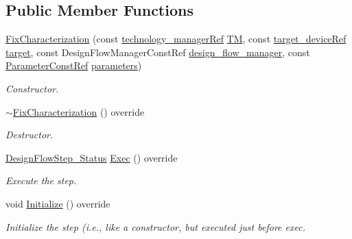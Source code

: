 \subsection*{Public Member Functions}
\begin{DoxyCompactItemize}
\item 
\hyperlink{classFixCharacterization_a4e029966461122b6b8d6d0cc25db66fc}{Fix\+Characterization} (const \hyperlink{technology__manager_8hpp_a4b9ecd440c804109c962654f9227244e}{technology\+\_\+manager\+Ref} \hyperlink{classTechnologyFlowStep_a4aeea30129ed65348c3bad932b3a135b}{TM}, const \hyperlink{target__device_8hpp_acedb2b7a617e27e6354a8049fee44eda}{target\+\_\+device\+Ref} \hyperlink{classTechnologyFlowStep_a1a16880c55bddc3f9dbc495636d7a8cb}{target}, const Design\+Flow\+Manager\+Const\+Ref \hyperlink{classDesignFlowStep_ab770677ddf087613add30024e16a5554}{design\+\_\+flow\+\_\+manager}, const \hyperlink{Parameter_8hpp_a37841774a6fcb479b597fdf8955eb4ea}{Parameter\+Const\+Ref} \hyperlink{classDesignFlowStep_a802eaafe8013df706370679d1a436949}{parameters})
\begin{DoxyCompactList}\small\item\em Constructor. \end{DoxyCompactList}\item 
\hyperlink{classFixCharacterization_aa5fbb89c33ae94a9c51600e510e7a312}{$\sim$\+Fix\+Characterization} () override
\begin{DoxyCompactList}\small\item\em Destructor. \end{DoxyCompactList}\item 
\hyperlink{design__flow__step_8hpp_afb1f0d73069c26076b8d31dbc8ebecdf}{Design\+Flow\+Step\+\_\+\+Status} \hyperlink{classFixCharacterization_a45c45b820d574101ae07841c5f773b6c}{Exec} () override
\begin{DoxyCompactList}\small\item\em Execute the step. \end{DoxyCompactList}\item 
void \hyperlink{classFixCharacterization_a1abe993122a5f39bbabbe3e1fca6141d}{Initialize} () override
\begin{DoxyCompactList}\small\item\em Initialize the step (i.\+e., like a constructor, but executed just before exec. \end{DoxyCompactList}\end{DoxyCompactItemize}
